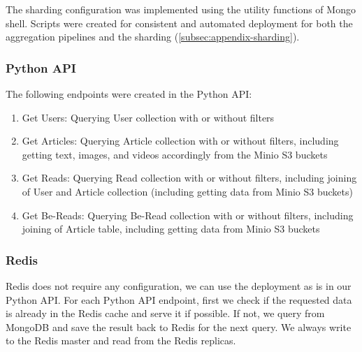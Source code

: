 \documentclass{report}
\begin{document}
    The sharding configuration was implemented using the utility functions of Mongo shell. Scripts were created for consistent and automated deployment for both the aggregation pipelines and the sharding (\ref{subsec:appendix-sharding}).

    \subsubsection{Python API}
    The following endpoints were created in the Python API:
    \begin{enumerate}
        \item Get Users: Querying User collection with or without filters
        \item Get Articles: Querying Article collection with or without filters, including getting text, images, and videos accordingly from the Minio S3 buckets
        \item Get Reads: Querying Read collection with or without filters, including joining of User and Article collection (including getting data from Minio S3 buckets)
        \item Get Be-Reads: Querying Be-Read collection with or without filters, including joining of Article table, including getting data from Minio S3 buckets
    \end{enumerate}

    \subsubsection{Redis}
    Redis does not require any configuration, we can use the deployment as is in our Python API. For each Python API endpoint, first we check if the requested data is already in the Redis cache and serve it if possible. If not, we query from MongoDB and save the result back to Redis for the next query. We always write to the Redis master and read from the Redis replicas.
\end{document}
